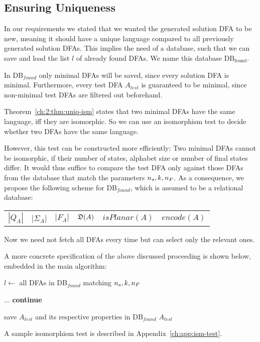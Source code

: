 \subsection{Ensuring Uniqueness}

In our requirements we stated that we wanted the generated solution DFA to be new, meaning it should have a unique language compared to all previously generated solution DFAs. This implies the need of a database, such that we can save and load the list $l$ of already found DFAs. We name this database $\text{DB}_\text{found}$.

In DB$_{found}$ only minimal DFAs will be saved, since every solution DFA is minimal. Furthermore, every test DFA $A_{test}$ is guaranteed to be minimal, since non-minimal test DFAs are filtered out beforehand.

Theorem~\ref{ch:2:thm:uniq-ism} states that two minimal DFAs have the same language, iff they are isomorphic. So we can use an isomorphism test to decide whether two DFAs have the same language.

However, this test can be constructed more efficiently: Two minimal DFAs cannot be isomorphic, if their number of states, alphabet size or number of final states differ. It would thus suffice to compare the test DFA only against those DFAs from the database that match the parameters ${n_s}, k, {n_F}$. As a consequence, we propose the following scheme for DB$_{found}$, which is assumed to be a relational database:
\begin{center}
	\begin{tabular}{c c c c c c}
	$|Q_A|$ & |$\Sigma_A$| & $|F_A|$ & $\mathfrak{D}(A)$ & $isPlanar(A)$ & $encode(A)$
	\end{tabular}
\end{center}
Now we need not fetch all DFAs every time but can select only the relevant ones.

A more concrete specification of the above discussed proceeding is shown below, embedded in the main algorithm:
\vspace{0.2cm}
\begin{algorithmic}[1]
	
		\vspace{0.2cm}
	
		\State $l \gets$ all DFAs in DB$_{found}$ matching ${n_s}, k, {n_F}$
		
		\vspace{0.2cm}
		
		
		\vspace{0.2cm}
		
			\State $\ldots$
				\State \textbf{continue}
			\EndIf
			
			\vspace{0.2cm}
			
			\State save $A_{test}$ and its respective properties in DB$_{found}$
			\State\Return $A_{test}$
		\EndWhile
	\EndFunction
\end{algorithmic}
\vspace{0.2cm}
A sample isomorphism test is described in Appendix~\ref{ch:app:ism-test}.

